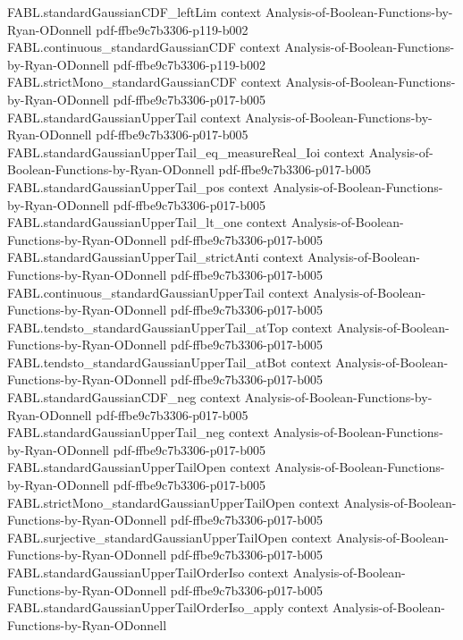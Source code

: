 \begin{theorem}
\proofstep
  {FABL.standardGaussianCDF_leftLim}
  {context}
  {Analysis-of-Boolean-Functions-by-Ryan-ODonnell}
  {pdf-ffbe9c7b3306-p119-b002}
\proofstep
  {FABL.continuous_standardGaussianCDF}
  {context}
  {Analysis-of-Boolean-Functions-by-Ryan-ODonnell}
  {pdf-ffbe9c7b3306-p119-b002}
\proofstep
  {FABL.strictMono_standardGaussianCDF}
  {context}
  {Analysis-of-Boolean-Functions-by-Ryan-ODonnell}
  {pdf-ffbe9c7b3306-p017-b005}
\proofstep
  {FABL.standardGaussianUpperTail}
  {context}
  {Analysis-of-Boolean-Functions-by-Ryan-ODonnell}
  {pdf-ffbe9c7b3306-p017-b005}
\proofstep
  {FABL.standardGaussianUpperTail_eq_measureReal_Ioi}
  {context}
  {Analysis-of-Boolean-Functions-by-Ryan-ODonnell}
  {pdf-ffbe9c7b3306-p017-b005}
\proofstep
  {FABL.standardGaussianUpperTail_pos}
  {context}
  {Analysis-of-Boolean-Functions-by-Ryan-ODonnell}
  {pdf-ffbe9c7b3306-p017-b005}
\proofstep
  {FABL.standardGaussianUpperTail_lt_one}
  {context}
  {Analysis-of-Boolean-Functions-by-Ryan-ODonnell}
  {pdf-ffbe9c7b3306-p017-b005}
\proofstep
  {FABL.standardGaussianUpperTail_strictAnti}
  {context}
  {Analysis-of-Boolean-Functions-by-Ryan-ODonnell}
  {pdf-ffbe9c7b3306-p017-b005}
\proofstep
  {FABL.continuous_standardGaussianUpperTail}
  {context}
  {Analysis-of-Boolean-Functions-by-Ryan-ODonnell}
  {pdf-ffbe9c7b3306-p017-b005}
\proofstep
  {FABL.tendsto_standardGaussianUpperTail_atTop}
  {context}
  {Analysis-of-Boolean-Functions-by-Ryan-ODonnell}
  {pdf-ffbe9c7b3306-p017-b005}
\proofstep
  {FABL.tendsto_standardGaussianUpperTail_atBot}
  {context}
  {Analysis-of-Boolean-Functions-by-Ryan-ODonnell}
  {pdf-ffbe9c7b3306-p017-b005}
\proofstep
  {FABL.standardGaussianCDF_neg}
  {context}
  {Analysis-of-Boolean-Functions-by-Ryan-ODonnell}
  {pdf-ffbe9c7b3306-p017-b005}
\proofstep
  {FABL.standardGaussianUpperTail_neg}
  {context}
  {Analysis-of-Boolean-Functions-by-Ryan-ODonnell}
  {pdf-ffbe9c7b3306-p017-b005}
\proofstep
  {FABL.standardGaussianUpperTailOpen}
  {context}
  {Analysis-of-Boolean-Functions-by-Ryan-ODonnell}
  {pdf-ffbe9c7b3306-p017-b005}
\proofstep
  {FABL.strictMono_standardGaussianUpperTailOpen}
  {context}
  {Analysis-of-Boolean-Functions-by-Ryan-ODonnell}
  {pdf-ffbe9c7b3306-p017-b005}
\proofstep
  {FABL.surjective_standardGaussianUpperTailOpen}
  {context}
  {Analysis-of-Boolean-Functions-by-Ryan-ODonnell}
  {pdf-ffbe9c7b3306-p017-b005}
\proofstep
  {FABL.standardGaussianUpperTailOrderIso}
  {context}
  {Analysis-of-Boolean-Functions-by-Ryan-ODonnell}
  {pdf-ffbe9c7b3306-p017-b005}
\proofstep
  {FABL.standardGaussianUpperTailOrderIso_apply}
  {context}
  {Analysis-of-Boolean-Functions-by-Ryan-ODonnell}

\end{theorem}
